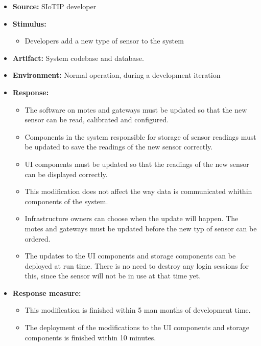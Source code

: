 \begin{itemize}
    \item \textbf{Source:} SIoTIP developer
    \item \textbf{Stimulus:}
        \begin{itemize}
            \item Developers add a new type of sensor to the system
        \end{itemize}

    \item \textbf{Artifact:} System codebase and database.
    \item \textbf{Environment:} Normal operation, during a development iteration
    \item \textbf{Response:}
        \begin{itemize}
            \item The software on motes and gateways must be updated so that
                  the new sensor can be read, calibrated and configured.
            \item Components in the system responsible for storage of sensor readings
                  must be updated to save the readings of the new sensor correctly.
            \item UI components must be updated so that the readings of the
                  new sensor can be displayed correctly.
            \item This modification does not affect the way data is communicated
                  whithin components of the system.
            \item Infrastructure owners can choose when the update will happen.
                  The motes and gateways must be updated before the new
                  typ of sensor can be ordered.
            \item The updates to the UI components and storage components can
                  be deployed at run time.
                  There is no need to destroy any login sessions for this, since the
                  sensor will not be in use at that time yet.
        \end{itemize}

    \item \textbf{Response measure:}
        \begin{itemize}
            \item This modification is finished within 5 man months of development time.
            \item The deployment of the modifications to the UI components and storage
                  components is finished within 10 minutes.
        \end{itemize}
\end{itemize}

